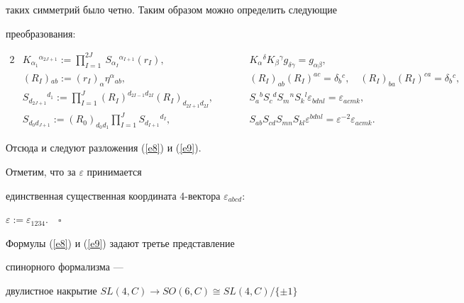 таких симметрий было четно. Таким образом можно определить следующие


преобразования:


\begin{alignat*}{2}




&K_{\alpha_1}{}^{\alpha_{2J+1}}:=


\prod_{I=1}^{2J}\ S_{\alpha_I}{}^{\alpha_{I+1}} (r_I), &\qquad


&K_\alpha{}^\delta K_\beta{}^\gamma g_{\delta\gamma}=g_{\alpha\beta}, \\


%


&(R_I){}_{ab}:=(r_I)_\alpha\eta^\alpha{}_{ab}, &\qquad


&(R_I)_{ab} (R_I)^{ac} =\delta_b{}^c,\quad (R_I)_{ba} (R_I)^{ca}


=\delta_b{}^c, \\


%


&S_{d_{2J+1}}{}^{d_1}:=\prod_{I=1}^{J}


(R_I)^{d_{2I-1}d_{2I}}(R_I)_{d_{2I+1}d_{2I}}, & \qquad


&S_a{}^b S_c{}^d S_m{}^n S_k{}^l\varepsilon_{bdnl}=


\varepsilon_{acmk}, \\


%


& S_{d_0d_{J+1}}:=(R_0)_{d_0d_1}


\prod_{I=1}^{J}S_{d_{I+1}}{}^{d_I}, &\qquad


&S_{ab} S_{cd} S_{mn} S_{kl}


\varepsilon^{bdnl}=\varepsilon^{-2}\varepsilon_{acmk}.


\end{alignat*}


Отсюда и следуют разложения (\ref{e8}) и (\ref{e9}).


Отметим, что за $\varepsilon$ принимается


единственная существенная координата 4-вектора $\varepsilon_{abcd}$:


$\varepsilon:=\varepsilon_{1234}.\quad\square$


\medskip





Формулы (\ref{e8}) и (\ref{e9}) задают третье представление


спинорного формализма ---


двулистное накрытие $SL(4,C) \to SO(6,C)\cong SL(4,C)/\{\pm 1\}$


